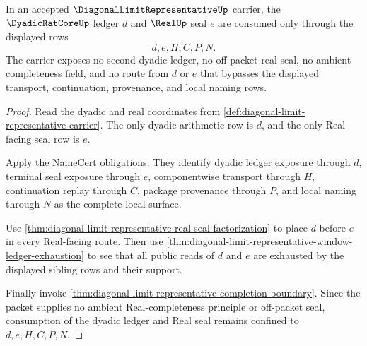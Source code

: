 \begin{theorem}
\label{thm:diagonal-limit-representative-dyadic-real-seal-nonescape}
In an accepted $\DiagonalLimitRepresentativeUp$ carrier, the $\DyadicRatCoreUp$ ledger $d$ and $\RealUp$ seal $e$ are consumed only through the displayed rows
$$
d,e,H,C,P,N.
$$
The carrier exposes no second dyadic ledger, no off-packet real seal, no ambient completeness field, and no route from $d$ or $e$ that bypasses the displayed transport, continuation, provenance, and local naming rows.
\end{theorem}
\begin{proof}
Read the dyadic and real coordinates from \autoref{def:diagonal-limit-representative-carrier}. The only dyadic arithmetic row is $d$, and the only Real-facing seal row is $e$.

Apply the NameCert obligations. They identify dyadic ledger exposure through $d$, terminal seal exposure through $e$, componentwise transport through $H$, continuation replay through $C$, package provenance through $P$, and local naming through $N$ as the complete local surface.

Use \autoref{thm:diagonal-limit-representative-real-seal-factorization} to place $d$ before $e$ in every Real-facing route. Then use \autoref{thm:diagonal-limit-representative-window-ledger-exhaustion} to see that all public reads of $d$ and $e$ are exhausted by the displayed sibling rows and their support.

Finally invoke \autoref{thm:diagonal-limit-representative-completion-boundary}. Since the packet supplies no ambient Real-completeness principle or off-packet seal, consumption of the dyadic ledger and Real seal remains confined to $d,e,H,C,P,N$.
\end{proof}

